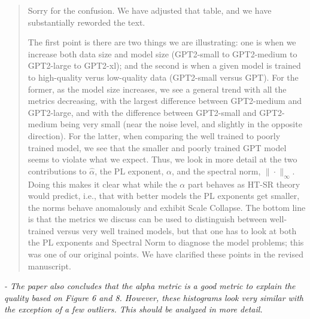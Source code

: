 \documentclass[11pt]{article}
\begin{document}
\begin{quote}
Sorry for the confusion.
We have adjusted that table, and we have substantially reworded the text.

The first point is there are two things we are illustrating: one is when we increase both data size and model size (GPT2-small to GPT2-medium to GPT2-large to GPT2-xl); and the second is when a given model is trained to high-quality verus low-quality data (GPT2-small versus GPT).
For the former, as the model size increases, we see a general trend with all the metrics decreasing, with the largest difference between GPT2-medium and GPT2-large, and with the difference between GPT2-small and GPT2-medium being very small (near the noise level, and slightly in the opposite direction).
For the latter, when comparing the well trained to poorly trained model, we see that the smaller and poorly trained GPT model seems to violate what we expect.
Thus, we look in more detail at the two contributions to 
$\hat{\alpha}$, 
the PL exponent, 
$\alpha$, 
and the spectral norm,
$\|\cdot\|_{\infty}$.
Doing this makes it clear what while the 
$\alpha$ 
part behaves as HT-SR theory would predict, 
i.e., 
that with better models the PL exponents get smaller, 
the norms behave anomalously and exhibit 
Scale Collapse.
The bottom line is that the metrics we discuss can be used to distinguish between well-trained versus very well trained models, but that one has to look at both the PL exponents and Spectral Norm to diagnose the model problems; this was one of our original points.
We have clarified these points in the revised manuscript.

\end{quote}

\noindent
\emph{%
- The paper also concludes that the alpha metric is a good metric to explain the quality based on Figure 6 and 8. However, these histograms look very similar with the exception of a few outliers. This should be analyzed in more detail.
}
\end{document}
